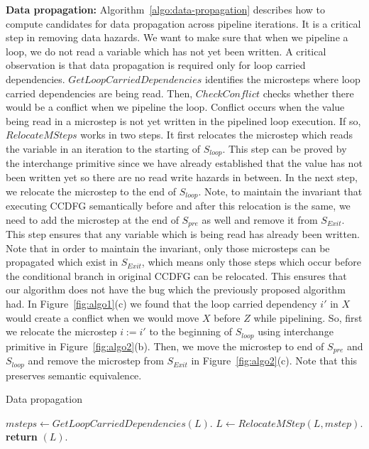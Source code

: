 {\bf Data propagation:} Algorithm~\ref{algo:data-propagation} describes how to compute candidates for data
propagation across pipeline iterations. It is a critical step in removing data hazards. We want to make sure that when we pipeline a loop, we do not read a variable which has not
yet been written. A critical observation is that data propagation is required only for loop carried dependencies.
$GetLoopCarriedDependencies$ identifies the microsteps where loop carried dependencies are being read. Then,
$CheckConflict$ checks whether there would be a conflict when we pipeline the loop.
Conflict occurs when the value being read in a microstep is not yet written in the pipelined loop execution. If so, $RelocateMSteps$ works in two steps. It first relocates the microstep which reads the variable in an iteration to the starting of $S_{loop}$. This step can be proved by the interchange primitive since we have already established that the value has not been written yet so there are no read write hazards in between. In the next step, we relocate the microstep to the end of $S_{loop}$. Note, to maintain the invariant that executing CCDFG semantically before and after this relocation is the same, we need to add the microstep at the end of $S_{pre}$ as well and remove it from $S_{Exit}$. This step ensures that any variable which is being read has already been written. Note that in order to maintain the invariant, only those microsteps can be propagated which exist in $S_{Exit}$, which means only those steps which occur before the conditional branch in original CCDFG can be relocated. This ensures that our algorithm does not have the bug which the previously proposed algorithm had.
In Figure~\ref{fig:algo1}(c) we found that the loop carried dependency $i'$ in $X$ would create a conflict when we would move $X$ before $Z$ while pipelining. So, first we relocate the microstep $i := i'$ to the beginning of $S_{loop}$ using interchange primitive in Figure~\ref{fig:algo2}(b). Then, we move the microstep to end of $S_{pre}$ and $S_{loop}$ and remove the microstep from $S_{Exit}$ in  Figure~\ref{fig:algo2}(c). Note that this preserves semantic equivalence.


\begin{algorithm}
\caption{Data propagation} \label{algo:data-propagation}
\begin{algorithmic}[1]
\State $msteps \leftarrow GetLoopCarriedDependencies(L)$.
\State $L \leftarrow RelocateMStep (L, mstep)$.
\EndIf
\EndFor
\State \textbf{return} $(L)$.
\EndProcedure
\end{algorithmic}
\end{algorithm}

